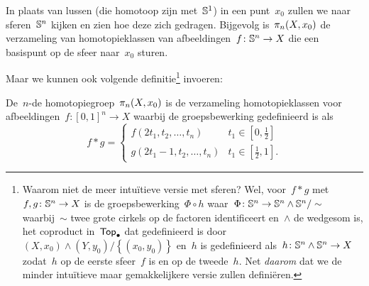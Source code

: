 \documentclass[a4paper,11pt,openany,oneside,article]{memoir}
\begin{document}
In plaats van lussen (die homotoop zijn met~$\mathbb{S}^1$) in een punt~$x_0$ zullen we naar sferen~$\mathbb{S}^n$ kijken en zien hoe deze zich gedragen. Bijgevolg is~$\pi_n(X,x_0)$ de verzameling van homotopieklassen van afbeeldingen~$f\colon\mathbb{S}^n\to X$ die een basispunt op de sfeer naar~$x_0$ sturen.

Maar we kunnen ook volgende definitie\footnote{Waarom niet de meer intu\"itieve versie met sferen? Wel, voor~$f\ast g$ met~$f,g\colon\mathbb{S}^n\to X$ is de groepsbewerking~$\Phi\circ h$ waar~$\Phi\colon\mathbb{S}^n\to\mathbb{S}^n\wedge\mathbb{S}^n/\sim$ waarbij~$\sim$ twee grote cirkels op de factoren identificeert en~$\wedge$ de wedgesom is, het coproduct in~$\mathsf{Top}_{\bullet}$ dat gedefinieerd is door~$(X,x_0)\wedge(Y,y_0)/\left\{ (x_0,y_0) \right\}
$ en~$h$ is gedefinieerd als~$h\colon\mathbb{S}^n\wedge\mathbb{S}^n\to X$ zodat~$h$ op de eerste sfeer~$f$ is en op de tweede~$h$. Net \emph{daarom} dat we de minder intu\"itieve maar gemakkelijkere versie zullen defini\"eren.} invoeren:

\begin{definition}
  De~$n$\nobreakdash-de homotopiegroep~$\pi_n(X,x_0)$ is de verzameling homotopieklassen voor afbeeldingen~$f\colon[0,1]^n\to X$ waarbij de groepsbewerking gedefinieerd is als
  \begin{equation}
    f\ast g=
    \begin{cases}
      f(2t_1,t_2,\ldots,t_n) & t_1\in\left[ 0,\frac{1}{2} \right] \\
      g(2t_1-1,t_2,\ldots,t_n) & t_1\in\left[ \frac{1}{2},1 \right].
    \end{cases}
  \end{equation}
\end{definition}
\end{document}
